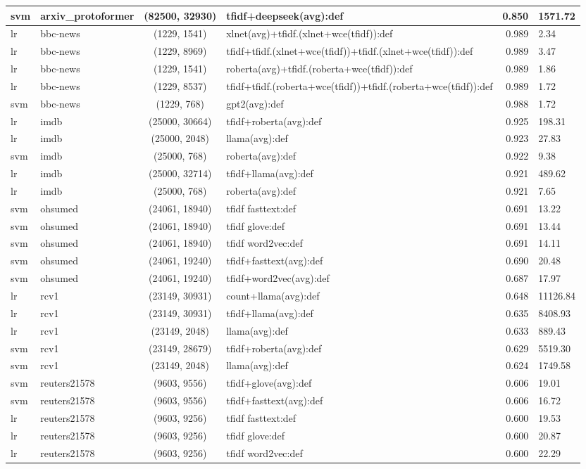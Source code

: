 \documentclass[final]{clv2025-revised}
\begin{document}
\begin{table}[h!]
\begin{tabular}{@{}p{.7cm} p{1.8cm} c >{\raggedright\arraybackslash}p{6.1cm} r p{1.0cm}@{}}
svm & arxiv\_protoformer & (82500, 32930) & tfidf+deepseek(avg):def & 0.850 & 1571.72 \\
\midrule
lr & bbc-news & (1229, 1541) & xlnet(avg)+tfidf.(xlnet+wce(tfidf)):def & 0.989 & 2.34 \\
lr & bbc-news & (1229, 8969) & tfidf+tfidf.(xlnet+wce(tfidf))+tfidf.(xlnet+wce(tfidf)):def & 0.989 & 3.47 \\
lr & bbc-news & (1229, 1541) & roberta(avg)+tfidf.(roberta+wce(tfidf)):def & 0.989 & 1.86 \\
lr & bbc-news & (1229, 8537) & tfidf+tfidf.(roberta+wce(tfidf))+tfidf.(roberta+wce(tfidf)):def & 0.989 & 1.72 \\
svm & bbc-news & (1229, 768) & gpt2(avg):def & 0.988 & 1.72 \\
\midrule
lr & imdb & (25000, 30664) & tfidf+roberta(avg):def & 0.925 & 198.31 \\
lr & imdb & (25000, 2048) & llama(avg):def & 0.923 & 27.83 \\
svm & imdb & (25000, 768) & roberta(avg):def & 0.922 & 9.38 \\
lr & imdb & (25000, 32714) & tfidf+llama(avg):def & 0.921 & 489.62 \\
lr & imdb & (25000, 768) & roberta(avg):def & 0.921 & 7.65 \\
\midrule
svm & ohsumed & (24061, 18940) & tfidf fasttext:def & 0.691 & 13.22 \\
svm & ohsumed & (24061, 18940) & tfidf glove:def & 0.691 & 13.44 \\
svm & ohsumed & (24061, 18940) & tfidf word2vec:def & 0.691 & 14.11 \\
svm & ohsumed & (24061, 19240) & tfidf+fasttext(avg):def & 0.690 & 20.48 \\
svm & ohsumed & (24061, 19240) & tfidf+word2vec(avg):def & 0.687 & 17.97 \\
\midrule
lr & rcv1 & (23149, 30931) & count+llama(avg):def & 0.648 & 11126.84 \\
lr & rcv1 & (23149, 30931) & tfidf+llama(avg):def & 0.635 & 8408.93 \\
lr & rcv1 & (23149, 2048) & llama(avg):def & 0.633 & 889.43 \\
svm & rcv1 & (23149, 28679) & tfidf+roberta(avg):def & 0.629 & 5519.30 \\
svm & rcv1 & (23149, 2048) & llama(avg):def & 0.624 & 1749.58 \\
\midrule
svm & reuters21578 & (9603, 9556) & tfidf+glove(avg):def & 0.606 & 19.01 \\
svm & reuters21578 & (9603, 9556) & tfidf+fasttext(avg):def & 0.606 & 16.72 \\
lr & reuters21578 & (9603, 9256) & tfidf fasttext:def & 0.600 & 19.53 \\
lr & reuters21578 & (9603, 9256) & tfidf glove:def & 0.600 & 20.87 \\
lr & reuters21578 & (9603, 9256) & tfidf word2vec:def & 0.600 & 22.29 \\
\bottomrule
\end{tabular}
\end{table}
\end{document}
